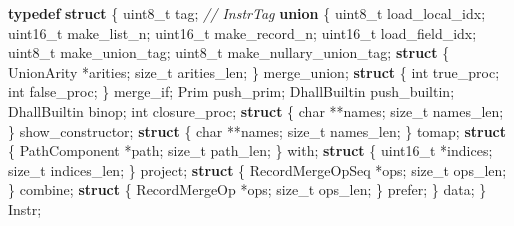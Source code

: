 \documentclass[]{article}
\newenvironment{Shaded}{}{}
\newcommand{\CommentTok}[1]{\textcolor[rgb]{0.38,0.63,0.69}{\textit{#1}}}
\newcommand{\DataTypeTok}[1]{\textcolor[rgb]{0.56,0.13,0.00}{#1}}
\newcommand{\KeywordTok}[1]{\textcolor[rgb]{0.00,0.44,0.13}{\textbf{#1}}}
\newcommand{\NormalTok}[1]{#1}
\newcommand{\OperatorTok}[1]{\textcolor[rgb]{0.40,0.40,0.40}{#1}}
\begin{document}
\begin{Shaded}
\begin{Highlighting}[]
\KeywordTok{typedef} \KeywordTok{struct} \OperatorTok{\{}
  \DataTypeTok{uint8\_t}\NormalTok{ tag}\OperatorTok{;}  \CommentTok{// InstrTag}
  \KeywordTok{union} \OperatorTok{\{}
    \DataTypeTok{uint8\_t}\NormalTok{ load\_local\_idx}\OperatorTok{;}
    \DataTypeTok{uint16\_t}\NormalTok{ make\_list\_n}\OperatorTok{;}
    \DataTypeTok{uint16\_t}\NormalTok{ make\_record\_n}\OperatorTok{;}
    \DataTypeTok{uint16\_t}\NormalTok{ load\_field\_idx}\OperatorTok{;}
    \DataTypeTok{uint8\_t}\NormalTok{ make\_union\_tag}\OperatorTok{;}
    \DataTypeTok{uint8\_t}\NormalTok{ make\_nullary\_union\_tag}\OperatorTok{;}
    \KeywordTok{struct} \OperatorTok{\{}\NormalTok{ UnionArity }\OperatorTok{*}\NormalTok{arities}\OperatorTok{;} \DataTypeTok{size\_t}\NormalTok{ arities\_len}\OperatorTok{;} \OperatorTok{\}}\NormalTok{ merge\_union}\OperatorTok{;}
    \KeywordTok{struct} \OperatorTok{\{} \DataTypeTok{int}\NormalTok{ true\_proc}\OperatorTok{;} \DataTypeTok{int}\NormalTok{ false\_proc}\OperatorTok{;} \OperatorTok{\}}\NormalTok{ merge\_if}\OperatorTok{;}
\NormalTok{    Prim push\_prim}\OperatorTok{;}
\NormalTok{    DhallBuiltin push\_builtin}\OperatorTok{;}
\NormalTok{    DhallBuiltin binop}\OperatorTok{;}
    \DataTypeTok{int}\NormalTok{ closure\_proc}\OperatorTok{;}
    \KeywordTok{struct} \OperatorTok{\{} \DataTypeTok{char} \OperatorTok{**}\NormalTok{names}\OperatorTok{;} \DataTypeTok{size\_t}\NormalTok{ names\_len}\OperatorTok{;} \OperatorTok{\}}\NormalTok{ show\_constructor}\OperatorTok{;}
    \KeywordTok{struct} \OperatorTok{\{} \DataTypeTok{char} \OperatorTok{**}\NormalTok{names}\OperatorTok{;} \DataTypeTok{size\_t}\NormalTok{ names\_len}\OperatorTok{;} \OperatorTok{\}}\NormalTok{ tomap}\OperatorTok{;}
    \KeywordTok{struct} \OperatorTok{\{}\NormalTok{ PathComponent }\OperatorTok{*}\NormalTok{path}\OperatorTok{;} \DataTypeTok{size\_t}\NormalTok{ path\_len}\OperatorTok{;} \OperatorTok{\}}\NormalTok{ with}\OperatorTok{;}
    \KeywordTok{struct} \OperatorTok{\{} \DataTypeTok{uint16\_t} \OperatorTok{*}\NormalTok{indices}\OperatorTok{;} \DataTypeTok{size\_t}\NormalTok{ indices\_len}\OperatorTok{;} \OperatorTok{\}}\NormalTok{ project}\OperatorTok{;}
    \KeywordTok{struct} \OperatorTok{\{}\NormalTok{ RecordMergeOpSeq }\OperatorTok{*}\NormalTok{ops}\OperatorTok{;} \DataTypeTok{size\_t}\NormalTok{ ops\_len}\OperatorTok{;} \OperatorTok{\}}\NormalTok{ combine}\OperatorTok{;}
    \KeywordTok{struct} \OperatorTok{\{}\NormalTok{ RecordMergeOp }\OperatorTok{*}\NormalTok{ops}\OperatorTok{;} \DataTypeTok{size\_t}\NormalTok{ ops\_len}\OperatorTok{;} \OperatorTok{\}}\NormalTok{ prefer}\OperatorTok{;}
  \OperatorTok{\}}\NormalTok{ data}\OperatorTok{;}
\OperatorTok{\}}\NormalTok{ Instr}\OperatorTok{;}


\end{Highlighting}
\end{Shaded}
\end{document}
